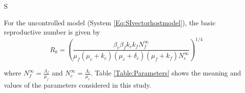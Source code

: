 S\documentclass[preprint,12pt]{elsarticle}
\begin{document}
\noindent For the uncontrolled model (System \ref{Eq:SIvectorhostmodel}), the basic reproductive number is given by
  \begin{equation}\label{eq:R0}
     R_0=\left(\frac{\beta_c\beta_f k_c k_fN_f^{\infty}}{\mu_f(\mu_c+k_c)(\mu_c+\delta_c)(\mu_f+k_f)N_c^{\infty}} \right)^{1/4}
 \end{equation}
 
\noindent where $
    \displaystyle
    N_f^{\infty}=\frac{\Lambda_f}{\mu_f}
    $ 
 and 
$
    \displaystyle
    N_c^{\infty} = \frac{\Lambda_c}{\mu_c}
$. Table \ref{Table:Parameters} shows 
 the meaning and values of the parameters considered in this study.
 

\end{document}
